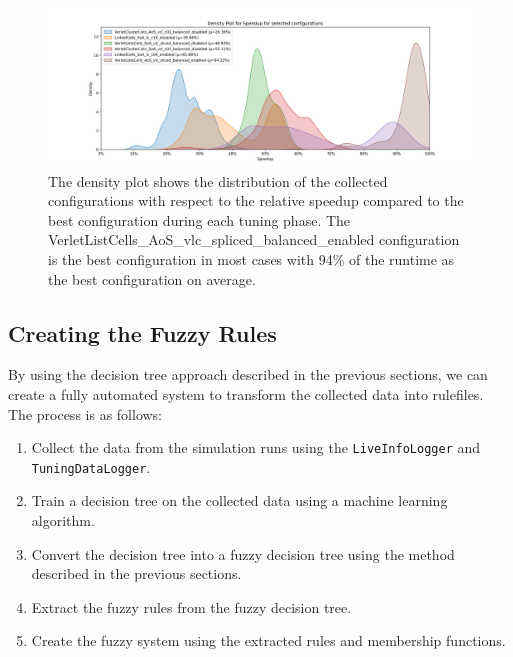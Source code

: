 \begin{figure}[h]
    \centering
    \includegraphics[width=\columnwidth,trim={1cm 0 2cm 1.5cm},clip]{figures/DataAnalytics/speedup_density_configurations.png}
    \caption[Speedup density plot of configurations]{The density plot shows the distribution of the collected configurations with respect to the relative speedup compared to the best configuration during each tuning phase. The VerletListCells\_AoS\_vlc\_spliced\_balanced\_enabled configuration is the best configuration in most cases with 94\% of the runtime as the best configuration on average.}
    \label{fig:inputAnalysisDensityConfigurations}
\end{figure}

\subsection{Creating the Fuzzy Rules}

By using the decision tree approach described in the previous sections, we can create a fully automated system to transform the collected data into rulefiles. The process is as follows:

\begin{enumerate}
    \item Collect the data from the simulation runs using the \texttt{LiveInfoLogger} and \texttt{TuningDataLogger}.
    \item Train a decision tree on the collected data using a machine learning algorithm.
    \item Convert the decision tree into a fuzzy decision tree using the method described in the previous sections.
    \item Extract the fuzzy rules from the fuzzy decision tree.
    \item Create the fuzzy system using the extracted rules and membership functions.
\end{enumerate}